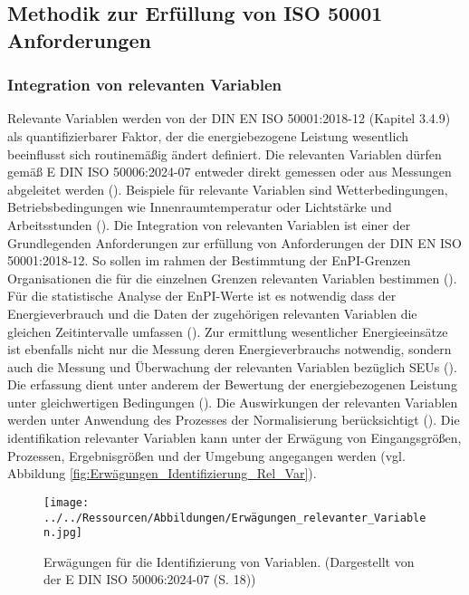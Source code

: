 \subsection{Methodik zur Erfüllung von ISO 50001 Anforderungen}

\subsubsection{Integration von relevanten Variablen}
Relevante Variablen werden von der DIN EN ISO 50001:2018-12 (Kapitel 3.4.9) als quantifizierbarer Faktor, der die energiebezogene Leistung wesentlich beeinflusst sich 
routinemäßig ändert definiert. 
Die relevanten Variablen dürfen gemäß E DIN ISO 50006:2024-07 entweder direkt gemessen oder aus Messungen abgeleitet werden (\cite[S. 18]{DIN50006.2024}).
Beispiele für relevante Variablen sind Wetterbedingungen, Betriebsbedingungen wie Innenraumtemperatur oder Lichtstärke und Arbeitsstunden (\cite[Kapitel 3.4.9]{DIN50001.2018}).
Die Integration von relevanten Variablen ist einer der Grundlegenden Anforderungen zur erfüllung von Anforderungen der DIN EN ISO 50001:2018-12.
So sollen im rahmen der Bestimmtung der EnPI-Grenzen Organisationen die für die einzelnen Grenzen relevanten Variablen bestimmen (\cite[S. 17]{DIN50006.2024}).
Für die statistische Analyse der EnPI-Werte ist es notwendig dass der Energieverbrauch und die Daten der zugehörigen relevanten Variablen 
die gleichen Zeitintervalle umfassen (\cite[S. 20]{DIN50006.2024}).
Zur ermittlung wesentlicher Energieeinsätze ist ebenfalls nicht nur die Messung deren Energieverbrauchs notwendig, sondern auch die Messung und Überwachung der 
relevanten Variablen bezüglich SEUs (\cite[S. 23]{DIN50001.2018}). 
Die erfassung dient unter anderem der Bewertung der energiebezogenen Leistung unter gleichwertigen Bedingungen (\cite[S. 8]{DIN50006.2024}). 
Die Auswirkungen der relevanten Variablen werden unter Anwendung des Prozesses der Normalisierung berücksichtigt (\cite[S. 8]{DIN50006.2024}).
Die identifikation relevanter Variablen kann unter der Erwägung von Eingangsgrößen, Prozessen, Ergebnisgrößen und der Umgebung angegangen werden 
(vgl. Abbildung \eqref{fig:Erwägungen_Identifizierung_Rel_Var}).

\begin{figure}[H]
    \centering
    \texttt{[image: ../../Ressourcen/Abbildungen/Erwägungen\_relevanter\_Variablen.jpg]}
    \caption{Erwägungen für die Identifizierung von Variablen. (Dargestellt von der E DIN ISO 50006:2024-07 (S. 18))}
    \label{fig:Erwägungen_Identifizierung_Rel_Var}
\end{figure}




